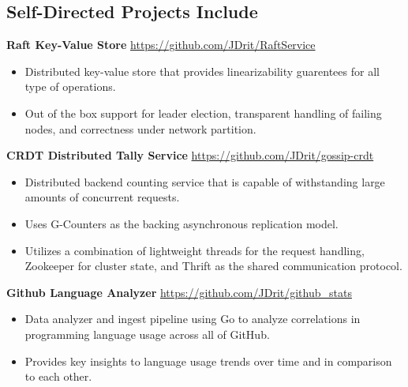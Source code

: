 \documentclass[overlapped,line]{resume}
\newcommand{\rurl}[1]{\hfill {\footnotesize \url{#1}}}
\begin{document}
\begin{resume}
\section{\mysidestyle Self-Directed Projects Include}


  \textbf{Raft Key-Value Store} \rurl{https://github.com/JDrit/RaftService}
  \begin{itemize}
    \item Distributed key-value store that provides linearizability guarentees for all type of
      operations.
    \item Out of the box support for leader election, transparent handling of failing nodes, and
      correctness under network partition.
  \end{itemize}

  \textbf{CRDT Distributed Tally Service} \rurl{https://github.com/JDrit/gossip-crdt}
  \begin{itemize}
    \item Distributed backend counting service that is capable of withstanding large amounts of
      concurrent requests.
    \item Uses G-Counters as the backing asynchronous replication model.
    \item Utilizes a combination of lightweight threads for the request handling, Zookeeper for
      cluster state, and Thrift as the shared communication protocol.
  \end{itemize}

  \textbf{Github Language Analyzer} \rurl{https://github.com/JDrit/github_stats}
  \begin{itemize}
    \item Data analyzer and ingest pipeline using Go to analyze correlations in programming language
      usage across all of GitHub.
    \item Provides key insights to language usage trends over time and in comparison to each other.
  \end{itemize}
\end{resume}
\end{document}
